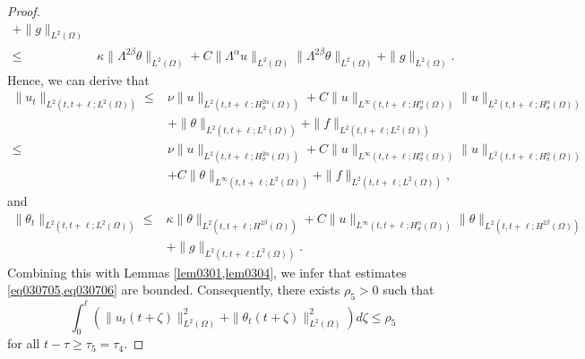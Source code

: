 \documentclass[oneside,preprint,12pt,numbers,sort&compress]{elsarticle}
\begin{document}
\begin{proof}
\begin{equation}
\begin{aligned}
+ \| g \|_{L^{2}(\Omega)}\\
\leq &
\kappa \| \Lambda^{2\beta} \theta  \|_{L^2(\Omega)}
+C \| \Lambda^{\alpha} u \|_{L^{2}(\Omega)}
\|\Lambda^{2\beta} \theta \|_{L^{2}(\Omega)}
+ \| g \|_{L^{2}(\Omega)}.
\end{aligned}
\end{equation}
Hence, we can derive that
\begin{equation}\label{eq030705}
\begin{aligned}
\|u_t\|_{L^{2}(t,t+\ell;L^{2}(\Omega))}
\leq &
\nu \| u \|_{L^{2}(t,t+\ell;H_\sigma^{2\alpha}(\Omega))} 
+C \|u \|_{L^{\infty}(t,t+\ell;H_\sigma^{\alpha}(\Omega))} 
\| u \|_{L^{2}(t,t+\ell;H_\sigma^{\alpha}(\Omega))}\\ 
&+ \| \theta \|_{L^{2}(t,t+\ell;L^{2}(\Omega))} 
+ \| f \|_{L^{2}(t,t+\ell;L^{2}(\Omega))} \\
\leq &
\nu \| u \|_{L^{2}(t,t+\ell;H_\sigma^{2\alpha}(\Omega))} 
+C \|u \|_{L^{\infty}(t,t+\ell;H_\sigma^{\alpha}(\Omega))} 
\| u \|_{L^{2}(t,t+\ell;H_\sigma^{\alpha}(\Omega))}\\ 
&+ C\| \theta \|_{L^{\infty}(t,t+\ell;L^{2}(\Omega))} 
+ \| f \|_{L^{2}(t,t+\ell;L^{2}(\Omega))} ,
\end{aligned}
\end{equation}
and
\begin{equation}\label{eq030706}
\begin{aligned}
\| \theta_t \|_{L^{2}(t,t+\ell;L^{2}(\Omega))}
\leq&
\kappa \| \theta \|_{L^{2}(t,t+\ell;H^{2\beta}(\Omega))}
+ C
\| u \|_{L^{\infty}(t,t+\ell;H_\sigma^{\alpha}(\Omega))}
\|\theta \|_{L^{2}(t,t+\ell;H^{2\beta}(\Omega))}
\\
&+ \| g \|_{L^{2}(t,t+\ell;L^{2}(\Omega))}.
\end{aligned}
\end{equation}
Combining this with Lemmas \cref{lem0301,lem0304}, we infer that estimates \cref{eq030705,eq030706} are bounded.
Consequently, there exists $\rho_5 >0$ such that 
\begin{equation}\label{eq030707}
\int_{0}^{\ell}\left( 
\|u_t(t+\zeta) \|_{L^{2}(\Omega)}^{2} 
+ 
\|\theta_t(t+\zeta) \|_{L^{2}(\Omega)}^{2} \right)  d\zeta 
\leq \rho_{5}
\end{equation}
for all $t-\tau \geq \tau_{5}=\tau_{4}$.
\end{proof}
\end{document}
